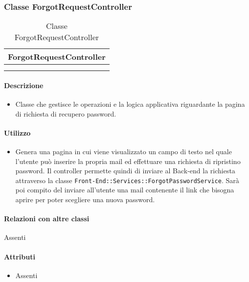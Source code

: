 \subsubsection{Classe ForgotRequestController}

\begin{table}[ht]
\begin{center}
\bgroup
\setlength{\arrayrulewidth}{0.6mm}
\def\arraystretch{1}
\begin{tabular}{ | p{12cm} | }
\hline
\centerline{\textbf{ForgotRequestController}}
\\ \hline
 \\ 
\hline
 \\ 
\hline
\end{tabular}
\egroup
\caption{Classe ForgotRequestController}
\end{center}
\end{table}

\paragraph*{Descrizione}
\begin{itemize}
\item[] Classe che gestisce le operazioni e la logica applicativa riguardante la pagina di richiesta di recupero password.
\end{itemize}

\paragraph*{Utilizzo}
\begin{itemize}
\item[] Genera una pagina in cui viene visualizzato un campo di testo nel quale l'utente può inserire la propria mail ed effettuare una richiesta di ripristino password. Il controller permette quindi di inviare al Back-end la richiesta attraverso la classe \texttt{Front-End::Services::ForgotPasswordService}. Sarà poi compito del  inviare all'utente una mail contenente il link che bisogna aprire per poter scegliere una nuova password.
\end{itemize}

\paragraph*{Relazioni con altre classi}
Assenti

\paragraph*{Attributi}
\begin{itemize}
\item[] Assenti
\end{itemize}

